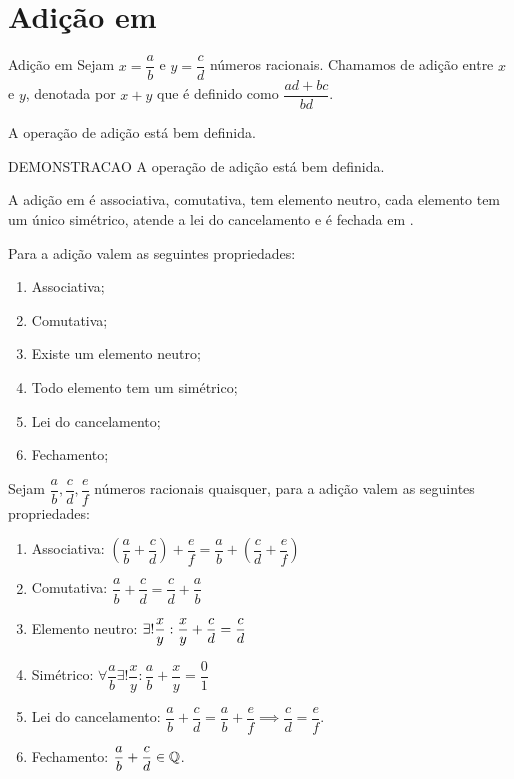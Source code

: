 \documentclass[../main.tex]{subfiles}
\begin{document}

\section{Adição em \Q}
\begin{defi}{Adição em \Q}
    Sejam $x = \dfrac{a}{b}$ e $y = \dfrac{c}{d}$ números racionais. Chamamos de adição entre $x$ e $y$, denotada por $x + y$ que é definido como $\dfrac{ad+bc}{bd}$.
\end{defi}
\begin{prop}
    A operação de adição está bem definida.
\end{prop}
\begin{dem}
    DEMONSTRACAO  A operação de adição está bem definida.
\end{dem}
\begin{prop}
    A adição em \Q é associativa, comutativa, tem elemento neutro, cada elemento tem um único simétrico, atende a lei do cancelamento e é fechada em \Q.
\end{prop}
\begin{prop}{Para a adição valem as seguintes propriedades:}
    \begin{enumerate}[label=(\roman*)]
        \item Associativa;
        \item Comutativa;
        \item Existe um elemento neutro; 
        \item Todo elemento tem um simétrico;
        \item Lei do cancelamento;
        \item Fechamento;
    \end{enumerate}
\end{prop}
\begin{prop}{Sejam $\dfrac{a}{b}, \dfrac{c}{d}, \dfrac{e}{f}$ números racionais quaisquer, para a adição valem as seguintes propriedades:}
    \begin{enumerate}[label=(\roman*)]
        \item Associativa: 
            $\left( \dfrac{a}{b} + \dfrac{c}{d}\right) + \dfrac{e}{f} = 
            \dfrac{a}{b} + \left(\dfrac{c}{d} + \dfrac{e}{f}\right)$
        
        \item Comutativa: $\dfrac{a}{b} + \dfrac{c}{d} = \dfrac{c}{d} + \dfrac{a}{b}$
        
        \item Elemento neutro: $\mathlarger{\exists!} \dfrac{x}{y} : \dfrac{x}{y} + \dfrac{c}{d} =     \dfrac{c}{d}$
        
        \item Simétrico: $\forall \dfrac{a}{b} \exists! \dfrac{x}{y} :  \dfrac{a}{b} + \dfrac{x}{y} = \dfrac{0}{1}$
        
        \item Lei do cancelamento:
            $\dfrac{a}{b} + \dfrac{c}{d} = \dfrac{a}{b} + \dfrac{e}{f} \implies \dfrac{c}{d} = \dfrac{e}{f}$.
            
        \item Fechamento:
        $\dfrac{a}{b} + \dfrac{c}{d} \in \mathbb{Q}$.
    \end{enumerate}
\end{prop}
\end{document}
